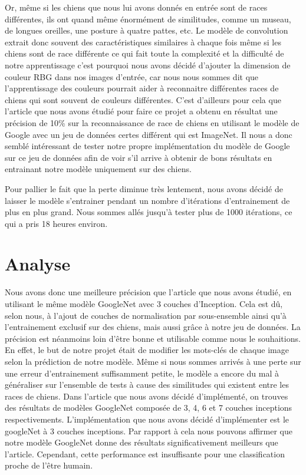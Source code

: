 \documentclass{article}
\begin{document}
Or, même si les chiens que nous lui avons donnés en entrée sont de races
différentes, ils ont quand même énormément de similitudes, comme un museau, de
longues oreilles, une posture à quatre pattes, etc. Le modèle de convolution
extrait donc souvent des caractéristiques similaires à chaque fois même si les
chiens sont de race différente ce qui fait toute la complexité et la difficulté
de notre apprentissage c’est pourquoi nous avons décidé d’ajouter la dimension
de couleur RBG dans nos images d’entrée, car nous nous sommes dit que
l’apprentissage des couleurs pourrait aider à reconnaitre différentes races de
chiens qui sont souvent de couleurs différentes. C’est d’ailleurs pour cela que
l’article que nous avons étudié pour faire ce projet a obtenu en résultat une
précision de 10\% sur la reconnaissance de race de chiens en utilisant le modèle
de Google avec un jeu de données certes différent qui est ImageNet. Il nous a
donc semblé intéressant de tester notre propre implémentation du modèle de
Google sur ce jeu de données afin de voir s'il arrive à obtenir de bons résultats
en entrainant notre modèle uniquement sur des chiens.

Pour pallier le fait que la perte diminue très lentement, nous avons décidé de
laisser le modèle s’entrainer pendant un nombre d’itérations d’entrainement de
plus en plus grand. Nous sommes allés jusqu’à tester plus de 1000 itérations, ce
qui a pris 18 heures environ.


\section{Analyse}

Nous avons donc une meilleure précision que l’article que nous avons étudié,
en utilisant le même modèle GoogleNet avec 3 couches d'Inception. Cela est dû,
selon nous, à l’ajout de couches de normalisation par sous-ensemble ainsi qu’à
l’entrainement exclusif sur des chiens, mais aussi grâce à notre jeu de données.
La précision est néanmoins loin d’être bonne et utilisable comme nous le
souhaitions. En effet, le but de notre projet était de modifier les mots-clés de
chaque image selon la prédiction de notre modèle. Même si nous sommes arrivés à
une perte sur une erreur d’entrainement suffisamment petite, le modèle a encore
du mal à généraliser sur l’ensemble de tests à cause des similitudes qui
existent entre les races de chiens. Dans l'article que nous avons décidé
d'implémenté, on trouves des résultats de modèles GoogleNet composée de 3, 4, 6
et 7 couches inceptions respectivements. L'implémentation que nous avons décidé
d'implémenter est le googleNet à 3 couches inceptions. Par rapport à cela nous
pouvons affirmer que notre modèle GoogleNet donne des résultats
significativement meilleurs que l'article. Cependant, cette performance est
insuffisante pour une classification proche de l'être humain.
\end{document}
